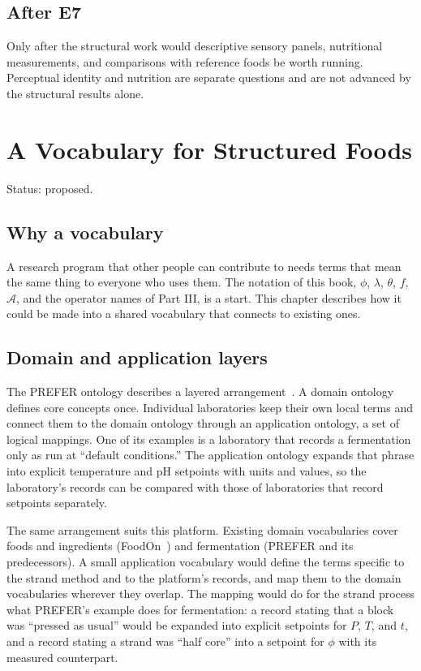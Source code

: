 \documentclass[11pt,openany]{book}
\theoremstyle{definition}
\begin{document}
\section*{After E7}

Only after the structural work would descriptive sensory panels, nutritional measurements, and comparisons with reference foods be worth running. Perceptual identity and nutrition are separate questions and are not advanced by the structural results alone.

\chapter{A Vocabulary for Structured Foods}\label{ch:vocabulary}

Status: proposed.

\section{Why a vocabulary}

A research program that other people can contribute to needs terms that mean the same thing to everyone who uses them. The notation of this book, $\phi$, $\lambda$, $\theta$, $f$, $\mathcal{A}$, and the operator names of Part III, is a start. This chapter describes how it could be made into a shared vocabulary that connects to existing ones.

\section{Domain and application layers}

The PREFER ontology describes a layered arrangement~\cite{prefer2026}. A domain ontology defines core concepts once. Individual laboratories keep their own local terms and connect them to the domain ontology through an application ontology, a set of logical mappings. One of its examples is a laboratory that records a fermentation only as run at ``default conditions.'' The application ontology expands that phrase into explicit temperature and pH setpoints with units and values, so the laboratory's records can be compared with those of laboratories that record setpoints separately.

The same arrangement suits this platform. Existing domain vocabularies cover foods and ingredients (FoodOn~\cite{foodon2018}) and fermentation (PREFER and its predecessors). A small application vocabulary would define the terms specific to the strand method and to the platform's records, and map them to the domain vocabularies wherever they overlap. The mapping would do for the strand process what PREFER's example does for fermentation: a record stating that a block was ``pressed as usual'' would be expanded into explicit setpoints for $P$, $T$, and $t$, and a record stating a strand was ``half core'' into a setpoint for $\phi$ with its measured counterpart.
\end{document}
